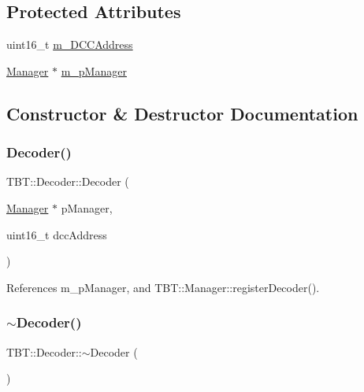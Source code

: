 \subsection*{Protected Attributes}
\begin{DoxyCompactItemize}
\item 
uint16\+\_\+t \hyperlink{classTBT_1_1Decoder_a14309179167dd46b722982301d651c4d_a14309179167dd46b722982301d651c4d}{m\+\_\+\+D\+C\+C\+Address}
\item 
\hyperlink{classTBT_1_1Manager}{Manager} $\ast$ \hyperlink{classTBT_1_1Decoder_a400475d21ba933f8b91e6f7d3053518b_a400475d21ba933f8b91e6f7d3053518b}{m\+\_\+p\+Manager}
\end{DoxyCompactItemize}


\subsection{Constructor \& Destructor Documentation}
\mbox{\label{classTBT_1_1Decoder_a69cc50cb8ca993a98802303b1c70eade_a69cc50cb8ca993a98802303b1c70eade}} 
\subsubsection{\texorpdfstring{Decoder()}{Decoder()}}
{\footnotesize\ttfamily T\+B\+T\+::\+Decoder\+::\+Decoder (\begin{DoxyParamCaption}\item[{\hyperlink{classTBT_1_1Manager}{Manager} $\ast$}]{p\+Manager,  }\item[{uint16\+\_\+t}]{dcc\+Address }\end{DoxyParamCaption})}



References m\+\_\+p\+Manager, and T\+B\+T\+::\+Manager\+::register\+Decoder().

\mbox{\label{classTBT_1_1Decoder_a44ed2f46ad692e6d7604121ed92e4474_a44ed2f46ad692e6d7604121ed92e4474}} 
\subsubsection{\texorpdfstring{$\sim$\+Decoder()}{~Decoder()}}
{\footnotesize\ttfamily T\+B\+T\+::\+Decoder\+::$\sim$\+Decoder (\begin{DoxyParamCaption}{ }\end{DoxyParamCaption})\hspace{0.3cm}{\ttfamily [virtual]}}



